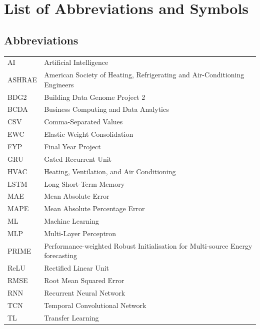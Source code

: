 \documentclass[12pt,a4paper]{report}
\begin{document}
\listoffigures
\clearpage

\listoftables
\clearpage

\chapter*{List of Abbreviations and Symbols}

\section*{Abbreviations}
\begin{tabular}{ll}
AI & Artificial Intelligence \\
ASHRAE & American Society of Heating, Refrigerating and Air-Conditioning Engineers \\
BDG2 & Building Data Genome Project 2 \\
BCDA & Business Computing and Data Analytics \\
CSV & Comma-Separated Values \\
EWC & Elastic Weight Consolidation \\
FYP & Final Year Project \\
GRU & Gated Recurrent Unit \\
HVAC & Heating, Ventilation, and Air Conditioning \\
LSTM & Long Short-Term Memory \\
MAE & Mean Absolute Error \\
MAPE & Mean Absolute Percentage Error \\
ML & Machine Learning \\
MLP & Multi-Layer Perceptron \\
PRIME & Performance-weighted Robust Initialisation for Multi-source Energy forecasting \\
ReLU & Rectified Linear Unit \\
RMSE & Root Mean Squared Error \\
RNN & Recurrent Neural Network \\
TCN & Temporal Convolutional Network \\
TL & Transfer Learning \\
\end{tabular}
\end{document}
